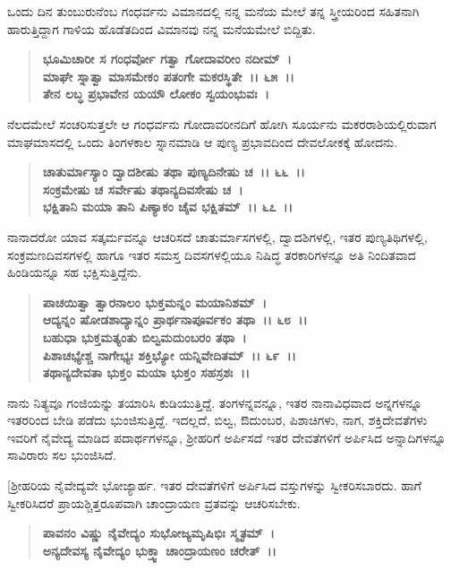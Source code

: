 ಒಂದು ದಿನ ತುಂಬುರುನೆಂಬ ಗಂಧರ್ವನು ವಿಮಾನದಲ್ಲಿ ನನ್ನ ಮನೆಯ ಮೇಲೆ ತನ್ನ ಸ್ತ್ರೀಯರಿಂದ ಸಹಿತನಾಗಿ ಹಾರುತ್ತಿದ್ದಾಗ ಗಾಳಿಯ ಹೊಡೆತದಿಂದ ವಿಮಾನವು ನನ್ನ ಮನೆಯಮೇಲೆ ಬಿದ್ದಿತು.

\begin{verse}
\textbf{ಭೂಮಿಚಾರೀ ಸ ಗಂಧರ್ವೋ ಗತ್ವಾ ಗೋದಾವರೀಂ ನದೀಮ್~।}\\\textbf{ಮಾಘೇ ಸ್ನಾತ್ವಾ ಮಾಸಮೇಕಂ ಪತಂಗೇ ಮಕರಸ್ಥಿತೇ~।। ೬೫~।। }\\\textbf{ತೇನ ಲಬ್ಧ ಪ್ರಭಾವೇನ ಯಯೌ ಲೋಕಂ ಸ್ವಯಂಭುವಃ~।}
\end{verse}

ನೆಲದಮೇಲೆ ಸಂಚರಿಸುತ್ತಲೇ ಆ ಗಂಧರ್ವನು ಗೋದಾವರೀನದಿಗೆ ಹೋಗಿ ಸೂರ್ಯನು ಮಕರರಾಶಿಯಲ್ಲಿರುವಾಗ ಮಾಘಮಾಸದಲ್ಲಿ ಒಂದು ತಿಂಗಳಕಾಲ ಸ್ನಾನಮಾಡಿ ಆ ಪುಣ್ಯ ಪ್ರಭಾವದಿಂದ ದೇವಲೋಕಕ್ಕೆ ಹೋದನು.

\begin{verse}
\textbf{ಚಾತುರ್ಮಾಸ್ಯಾಂ ದ್ವಾದಶೀಷು ತಥಾ ಪುಣ್ಯದಿನೇಷು ಚ~।। ೬೬~।।}\\\textbf{ಸಂಕ್ರಮೇಷು ಚ ಸರ್ವೇಷು ತಥಾನ್ಯದಿವಸೇಷು ಚ~। }\\\textbf{ಭಕ್ಷಿತಾನಿ ಮಯಾ ತಾನಿ ಪಿಣ್ಯಾಕಂ ಚೈವ ಭಕ್ಷಿತಮ್~।। ೬೭~।।}
\end{verse}

ನಾನಾದರೋ ಯಾವ ಸತ್ಕರ್ಮವನ್ನೂ ಆಚರಿಸದೆ ಚಾತುರ್ಮಾಸಗಳಲ್ಲಿ, ದ್ವಾದಶಿಗಳಲ್ಲಿ, ಇತರ ಪುಣ್ಯತಿಥಿಗಳಲ್ಲಿ, ಸಂಕ್ರಮಣದಿವಸಗಳಲ್ಲಿ ಹಾಗೂ ಇತರ ಸಮಸ್ತ ದಿವಸಗಳಲ್ಲಿಯೂ ನಿಷಿದ್ಧ ತರಕಾರಿಗಳನ್ನೂ ಅತಿ ನಿಂದಿತವಾದ ಹಿಂಡಿಯನ್ನೂ ಸಹ ಭಕ್ಷಿಸುತ್ತಿದ್ದೆನು.

\begin{verse}
\textbf{ಪಾಚಯಿತ್ವಾ ತ್ವಾರನಾಲಂ ಭುಕ್ತಮನ್ನಂ ಮಯಾನಿಶಮ್~।}\\\textbf{ಆದ್ಯನ್ನಂ ಷೋಡಶಾದ್ಯಾನ್ನಂ ಪ್ರಾರ್ಥನಾಪೂರ್ವಕಂ ತಥಾ~।। ೬೮~।। }\\\textbf{ಬಹುಧಾ ಭುಕ್ತಮತ್ಯಂತು ಬಿಲ್ವಮದುಂಬರಂ ತಥಾ~।}\\\textbf{ಪಿಶಾಚಭ್ಯೇಶ್ಚ ನಾಗೇಭ್ಯಃ ಶಕ್ತಿಭ್ಯೋ ಯನ್ನಿವೇದಿತಮ್~।। ೬೯~।।} \\\textbf{ತಥಾನ್ಯದೇವತಾ ಭುಕ್ತಂ ಮಯಾ ಭುಕ್ತಂ ಸಹಸ್ರಶಃ~।।}
\end{verse}

ನಾನು ನಿತ್ಯವೂ ಗಂಜಿಯನ್ನು ತಯಾರಿಸಿ ಕುಡಿಯುತ್ತಿದ್ದೆ. ತಂಗಳನ್ನವನ್ನೂ, ಇತರ ನಾನಾವಿಧವಾದ ಅನ್ನಗಳನ್ನೂ ಇತರರಿಂದ ಬೇಡಿ ಪಡೆದು ಭುಂಜಿಸುತ್ತಿದ್ದೆ. ಇದಲ್ಲದೆ, ಬಿಲ್ವ, ಔದುಂಬರ, ಪಿಶಾಚಿಗಳು, ನಾಗ, ಶಕ್ತಿದೇವತೆಗಳು ಇವರಿಗೆ ನೈವೇದ್ಯ ಮಾಡಿದ ಪದಾರ್ಥಗಳನ್ನೂ, ಶ‍್ರೀಹರಿಗೆ ಅರ್ಪಿಸದೆ ಇತರ ದೇವತೆಗಳಿಗೆ ಅರ್ಪಿಸಿದ ಅನ್ನಾದಿಗಳನ್ನೂ ಸಾವಿರಾರು ಸಲ ಭುಂಜಿಸಿದೆ.

[ಶ‍್ರೀಹರಿಯ ನೈವೇದ್ಯವೇ ಭೋಜ್ಯಾರ್ಹ. ಇತರ ದೇವತೆಗಳಿಗೆ ಅರ್ಪಿಸಿದ ವಸ್ತುಗಳನ್ನು ಸ್ವೀಕರಿಸಬಾರದು. ಹಾಗೆ ಸ್ವೀಕರಿಸಿದರೆ ಪ್ರಾಯಶ್ಚಿತ್ತರೂಪವಾಗಿ ಚಾಂದ್ರಾಯಣ ವ್ರತವನ್ನು ಆಚರಿಸಬೇಕು.

\begin{verse}
\textbf{ಪಾವನಂ ವಿಷ್ಣು ನೈವೇದ್ಯಂ ಸುಭೋಜ್ಯಮೃಷಿಭಿಃ ಸ್ಮೃತಮ್~।}\\\textbf{ಅನ್ಯದೇವಸ್ಯ ನೈವೇದ್ಯಂ ಭುಕ್ತ್ವಾ ಚಾಂದ್ರಾಯಣಂ ಚರೇತ್~।।}
\end{verse}

